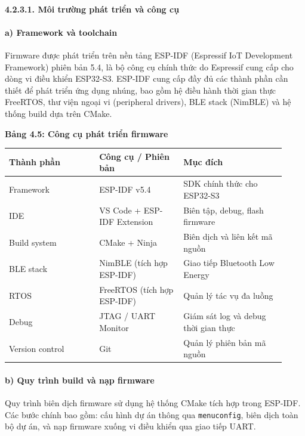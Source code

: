 \documentclass[13pt,a4paper]{extarticle}
\newcounter{none} %
\newcommand{\thesislongtableorignewline}{}
\let\thesislongtableorignewline\\
\renewcommand{\\}{\thesislongtableorignewline\hline}%
\let\\\thesislongtableorignewline
\newcommand{\thesistabletitle}[1]{%
  \begin{center}\textbf{#1}\end{center}%
}
\begin{document}
\paragraph{4.2.3.1. Môi trường phát triển và công
cụ}\label{4231-muxf4i-trux1b0ux1eddng-phuxe1t-triux1ec3n-vuxe0-cuxf4ng-cux1ee5}

\paragraph{a) Framework và toolchain}\label{a-framework-vuxe0-toolchain}

Firmware được phát triển trên nền tảng ESP-IDF (Espressif IoT
Development Framework) phiên bản 5.4, là bộ công cụ chính thức do
Espressif cung cấp cho dòng vi điều khiển ESP32-S3. ESP-IDF cung cấp đầy
đủ các thành phần cần thiết để phát triển ứng dụng nhúng, bao gồm hệ
điều hành thời gian thực FreeRTOS, thư viện ngoại vi (peripheral
drivers), BLE stack (NimBLE) và hệ thống build dựa trên CMake.

\thesistabletitle{Bảng 4.5: Công cụ phát triển firmware}

{\def\LTcaptype{none} %
\begin{longtable}{|p{0.30\linewidth}|p{0.28\linewidth}|p{0.34\linewidth}|}
\hline \textbf{Thành phần} & \textbf{Công cụ / Phiên bản} & \textbf{Mục đích} \\
\hline
\endhead
\hline
\endlastfoot
Framework & ESP-IDF v5.4 & SDK chính thức cho ESP32-S3 \\
IDE & VS Code + ESP-IDF Extension & Biên tập, debug, flash firmware \\
Build system & CMake + Ninja & Biên dịch và liên kết mã nguồn \\
BLE stack & NimBLE (tích hợp ESP-IDF) & Giao tiếp Bluetooth Low
Energy \\
RTOS & FreeRTOS (tích hợp ESP-IDF) & Quản lý tác vụ đa luồng \\
Debug & JTAG / UART Monitor & Giám sát log và debug thời gian thực \\
Version control & Git & Quản lý phiên bản mã nguồn \\
\end{longtable}
}

\paragraph{b) Quy trình build và nạp
firmware}\label{b-quy-truxecnh-build-vuxe0-nux1ea1p-firmware}

Quy trình biên dịch firmware sử dụng hệ thống CMake tích hợp trong
ESP-IDF. Các bước chính bao gồm: cấu hình dự án thông qua
\texttt{menuconfig}, biên dịch toàn bộ dự án, và nạp firmware xuống vi
điều khiển qua giao tiếp UART.
\end{document}
